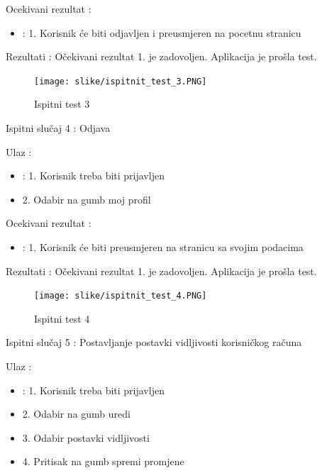 			\noindent Ocekivani rezultat : 

			\begin{itemize}
				\item : 1. Korisnik će biti odjavljen i preusmjeren na pocetnu stranicu
			\end{itemize}
	
			\noindent Rezultati : Očekivani rezultat 1. je zadovoljen. Aplikacija je prošla test. 

			\begin{figure}[H]
				\texttt{[image: slike/ispitnit\_test\_3.PNG]} %
				\caption{Ispitni test 3}
				\label{fig:Test3} %
			\end{figure}	

			\noindent Ispitni slučaj 4 : Odjava

			\noindent Ulaz : 
	
			\begin{itemize}
				\item : 1. Korisnik treba biti prijavljen
				\item   2. Odabir na gumb moj profil
			\end{itemize}

			\noindent Ocekivani rezultat : 

			\begin{itemize}
				\item : 1. Korisnik će biti preusmjeren na stranicu sa svojim podacima
			\end{itemize}
	
			\noindent Rezultati : Očekivani rezultat 1. je zadovoljen. Aplikacija je prošla test. 

			\begin{figure}[H]
				\texttt{[image: slike/ispitnit\_test\_4.PNG]} %
				\caption{Ispitni test 4}
				\label{fig:Test4} %
			\end{figure}				

			\noindent Ispitni slučaj 5 : Postavljanje postavki vidljivosti korisničkog računa

			\noindent Ulaz : 
	
			\begin{itemize}
				\item : 1. Korisnik treba biti prijavljen
				\item   2. Odabir na gumb uredi
				\item   3. Odabir postavki vidljivosti
				\item   4. Pritisak na gumb spremi promjene
			\end{itemize}

